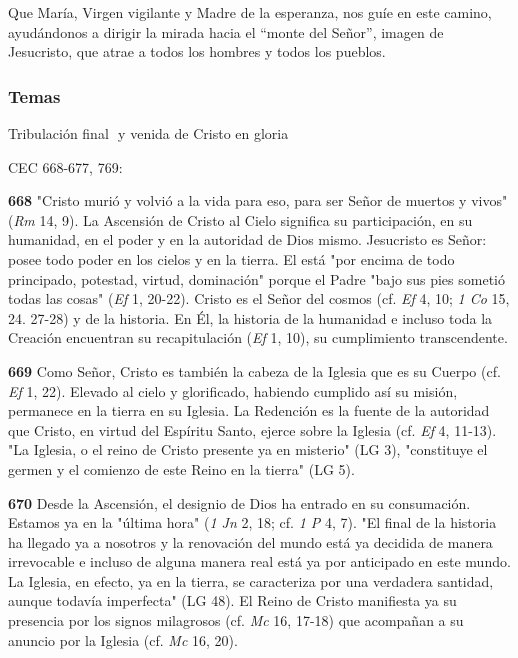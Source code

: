 Que María, Virgen vigilante y Madre de la esperanza, nos guíe en este camino, ayudándonos a dirigir la mirada hacia el ``monte del Señor'', imagen de Jesucristo, que atrae a todos los hombres y todos los pueblos.

\protect\hypertarget{_Toc448709347}{}{\protect\hypertarget{_Toc449554349}{}{}}

\subsubsection{Temas}\label{temas}

Tribulación final  y venida de Cristo en gloria

CEC 668-677, 769:

\textbf{668} "Cristo murió y volvió a la vida para eso, para ser Señor de muertos y vivos" (\emph{Rm} 14, 9). La Ascensión de Cristo al Cielo significa su participación, en su humanidad, en el poder y en la autoridad de Dios mismo. Jesucristo es Señor: posee todo poder en los cielos y en la tierra. El está "por encima de todo principado, potestad, virtud, dominación" porque el Padre "bajo sus pies sometió todas las cosas" (\emph{Ef} 1, 20-22). Cristo es el Señor del cosmos (cf. \emph{Ef} 4, 10; \emph{1 Co} 15, 24. 27-28) y de la historia. En Él, la historia de la humanidad e incluso toda la Creación encuentran su recapitulación (\emph{Ef} 1, 10), su cumplimiento transcendente.

\textbf{669} Como Señor, Cristo es también la cabeza de la Iglesia que es su Cuerpo (cf. \emph{Ef} 1, 22). Elevado al cielo y glorificado, habiendo cumplido así su misión, permanece en la tierra en su Iglesia. La Redención es la fuente de la autoridad que Cristo, en virtud del Espíritu Santo, ejerce sobre la Iglesia (cf. \emph{Ef} 4, 11-13). "La Iglesia, o el reino de Cristo presente ya en misterio" (LG 3), "constituye el germen y el comienzo de este Reino en la tierra" (LG 5).

\textbf{670} Desde la Ascensión, el designio de Dios ha entrado en su consumación. Estamos ya en la "última hora" (\emph{1 Jn} 2, 18; cf. \emph{1 P} 4, 7). "El final de la historia ha llegado ya a nosotros y la renovación del mundo está ya decidida de manera irrevocable e incluso de alguna manera real está ya por anticipado en este mundo. La Iglesia, en efecto, ya en la tierra, se caracteriza por una verdadera santidad, aunque todavía imperfecta" (LG 48). El Reino de Cristo manifiesta ya su presencia por los signos milagrosos (cf. \emph{Mc} 16, 17-18) que acompañan a su anuncio por la Iglesia (cf. \emph{Mc} 16, 20).

